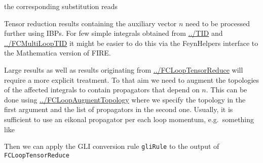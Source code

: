 \documentclass[../FeynCalcManual.tex]{subfiles}
\begin{document}
the corresponding substitution reads

\begin{Shaded}
\begin{Highlighting}[]
\OtherTok{{-}\textgreater{}} \OperatorTok{\{}\OperatorTok{[}\OperatorTok{,}\OperatorTok{]} \OtherTok{{-}\textgreater{}}\OperatorTok{[}\OperatorTok{,}\OperatorTok{]\}}
\end{Highlighting}
\end{Shaded}

Tensor reduction results containing the auxiliary vector \(n\) need to
be processed further using IBPs. For few simple integrals obtained from
\hyperlink{../tid}{../TID} and
\hyperlink{../fcmultilooptid}{../FCMultiLoopTID} it might be easier to
do this via the FeynHelpers interface to the Mathematica version of
FIRE.

Large results as well as results originating from
\hyperlink{../fclooptensorreduce}{../FCLoopTensorReduce} will require a
more explicit treatment. To that aim we need to augment the topologies
of the affected integrals to contain propagators that depend on \(n\).
This can be done using
\hyperlink{../fcloopaugmenttopology}{../FCLoopAugmentTopology} where we
specify the topology in the first argument and the list of propagators
in the second one. Usually, it is sufficient to use an eikonal
propagator per each loop momentum, e.g.~something like

\begin{Shaded}
\begin{Highlighting}[]
\OperatorTok{\{}\OperatorTok{,}\OperatorTok{\}} \ExtensionTok{=}\OperatorTok{[}\OperatorTok{,} \OperatorTok{\{}\OperatorTok{[\{\{}\OperatorTok{,}\OperatorTok{\}\}],}\OperatorTok{[\{\{}\OperatorTok{,}\OperatorTok{\}\}],}\OperatorTok{\}]}
\end{Highlighting}
\end{Shaded}

Then we can apply the GLI conversion rule \texttt{gliRule} to the output
of \texttt{FCLoopTensorReduce}

\begin{Shaded}
\begin{Highlighting}[]
\end{Highlighting}
\end{Shaded}
\end{document}
